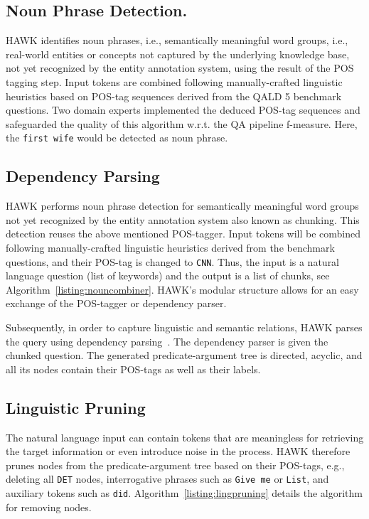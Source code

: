 \subsection{Noun Phrase Detection.}
HAWK identifies noun phrases, i.e., semantically meaningful word groups, i.e., real-world entities or concepts not captured by the underlying knowledge base, not yet recognized by the entity annotation system, using the result of the POS tagging step. 
Input tokens are combined following manually-crafted linguistic heuristics based on POS-tag sequences derived from the QALD 5 benchmark questions. %
Two domain experts implemented the deduced POS-tag sequences and safeguarded the quality of this algorithm w.r.t. the QA pipeline f-measure. 
Here, the \texttt{first wife} would be detected as noun phrase.


\subsection{Dependency Parsing}


HAWK performs noun phrase detection for semantically meaningful word groups not yet recognized by the entity annotation system also known as chunking.
This detection reuses the above mentioned POS-tagger. %
Input tokens will be combined following manually-crafted linguistic heuristics derived from the benchmark questions, and their POS-tag is changed to \texttt{CNN}.
Thus, the input is a natural language question (list of keywords) and the output is a list of chunks, see Algorithm~\ref{listing:nouncombiner}.
HAWK's modular structure allows for an easy exchange of the POS-tagger or dependency parser.

Subsequently, in order to capture linguistic and semantic relations, HAWK parses the query using dependency parsing~\cite{choi2011getting}.
The dependency parser is given the chunked question. 
The generated pre\-dicate-argument tree is directed, acyclic, and all its nodes contain their POS-tags as well as their labels.

\subsection{Linguistic Pruning}

The natural language input can contain tokens that are meaningless for retrieving the target information or even introduce noise in the process.
HAWK therefore prunes nodes from the predicate-argument tree based on their POS-tags, e.g., deleting all \texttt{DET} nodes, interrogative phrases such as \texttt{Give me} or \texttt{List}, and auxiliary tokens such as \texttt{did}.
Algorithm~\ref{listing:lingpruning} details the algorithm for removing nodes.

